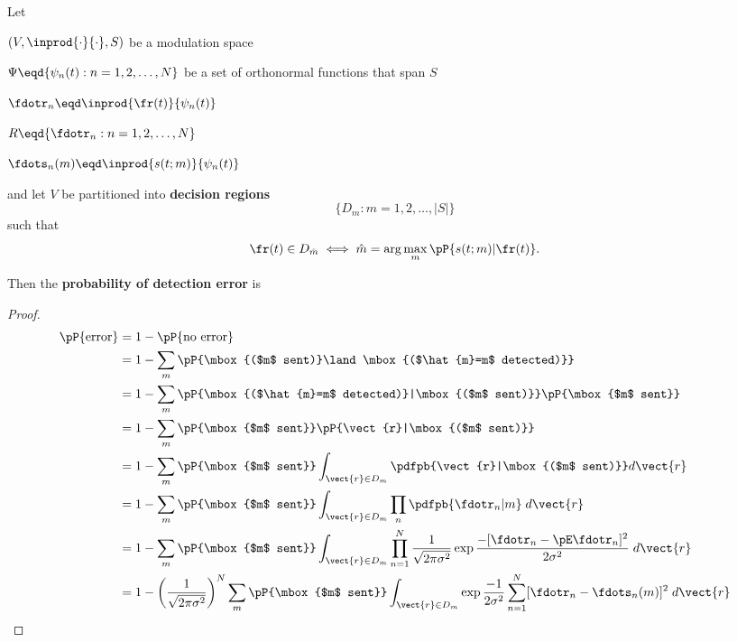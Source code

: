 \begin{theorem}
Let 
\begin{liste}
   \item $(V, \inprod{\cdot}{\cdot}, S)$ be a modulation space 
   \item $\Psi\eqd\{ \psi_n(t): n=1,2,\ldots,N\}$ 
         be a set of orthonormal functions that span $S$
   \item $\fdotr_n\eqd \inprod{\fr(t)}{\psi_n(t)}$
   \item $R \eqd \{ \fdotr_n: n=1,2,\ldots, N\}$
   \item $\fdots_n(m)\eqd \inprod{s(t;m)}{\psi_n(t)}$
\end{liste}

and let $V$ be partitioned into {\bf decision regions}
\[ \{ D_m: m=1,2,\ldots, |S|\} \]
such that 
\[ \fr(t)\in D_{\hat{m}} \iff \hat{m}=\arg\max_m\pP{s(t;m)|\fr(t)}. \]

Then the {\bf probability of detection error} is
\end{theorem}
\begin{proof}
\begin{align*}
   \pP{\mbox{error}}
     &= 1 - \pP{\mbox{no error}}
   \\&= 1 - \sum_m \pP{\mbox{($m$ sent)}\land\mbox{($\hat{m}=m$ detected)}}
   \\&= 1 - \sum_m \pP{\mbox{($\hat{m}=m$ detected)}|\mbox{($m$ sent)}}
                   \pP{\mbox{$m$ sent}}
   \\&= 1 - \sum_m \pP{\mbox{$m$ sent}}
                   \pP{\vect{r}|\mbox{($m$ sent)}}
   \\&= 1 - \sum_m \pP{\mbox{$m$ sent}}
                   \int_{\vect{r}\in D_m}\pdfpb{\vect{r}|\mbox{($m$ sent)}} d\vect{r}
   \\&= 1 - \sum_m \pP{\mbox{$m$ sent}}
                   \int_{\vect{r}\in D_m} \prod_n \pdfpb{\fdotr_n|m} \;d\vect{r}
   \\&= 1 - \sum_m \pP{\mbox{$m$ sent}}
                   \int_{\vect{r}\in D_m} \prod_{n=1}^N
                   \frac{1}{\sqrt{2\pi\sigma^2}}
                   \exp{\frac{-[\fdotr_n-\pE\fdotr_n]^2}{2\sigma^2}}
                   \;d\vect{r}
   \\&= 1 - \left( \frac{1}{\sqrt{2\pi\sigma^2}} \right)^N
        \sum_m \pP{\mbox{$m$ sent}}
        \int_{\vect{r}\in D_m} 
        \exp{\frac{-1}{2\sigma^2}
                  \sum_{n=1}^N [\fdotr_n-\fdots_n(m)]^2 }
        \;d\vect{r}
\end{align*}
\end{proof}



